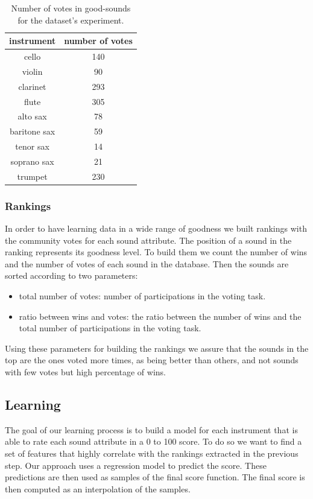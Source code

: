 \documentclass{article}
\begin{document}
\begin{table}[ht]
\centering
\begin{tabular}{cc}
\hline
instrument   & number of votes \\ \hline
cello        & 140             \\
violin       & 90              \\
clarinet     & 293             \\
flute        & 305             \\
alto sax     & 78              \\
baritone sax & 59              \\
tenor sax    & 14              \\
soprano sax  & 21              \\
trumpet      & 230             \\ \hline
\end{tabular}
\caption{Number of votes in good-sounds for the dataset's experiment.}
\label{votes}
\end{table}

\subsubsection{Rankings}
In order to have learning data in a wide range of goodness we built rankings with the community votes for each sound attribute. The position of a sound in the ranking represents its goodness level. To build them we count the number of wins and the number of votes of each sound in the database. Then the sounds are sorted according to two parameters: 

\begin{itemize}
	\item{total number of votes: number of participations in the voting task.}
	\item{ratio between wins and votes: the ratio between the number of wins and the total number of participations in the voting task.}
\end{itemize}
  
Using these parameters for building the rankings we assure that the sounds in the top are the ones voted more times, as being better than others, and not sounds with few votes but high percentage of wins.

\subsection{Learning}
The goal of our learning process is to build a model for each instrument that is able to rate each sound attribute in a 0 to 100 score. To do so we want to find a set of features that highly correlate with the rankings extracted in the previous step.  
Our approach uses a regression model to predict the score. These predictions are then used as samples of the final score function. The final score is then computed as an interpolation of the samples.
\end{document}
